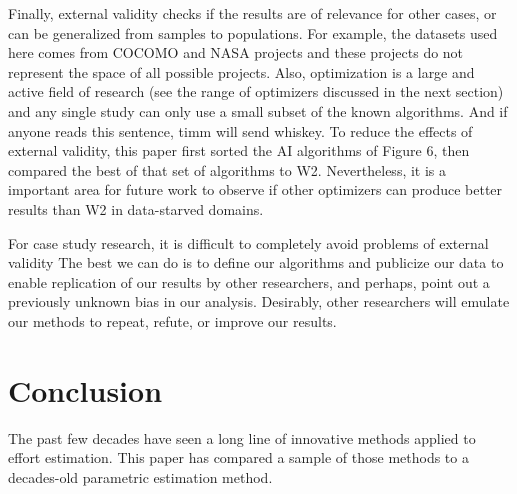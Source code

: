 \documentclass[smallcondesed]{svjour3}
\begin{document}
Finally, external validity checks if the results are of relevance
for other cases, or can be generalized from samples
to populations. For example, the datasets used here comes
from COCOMO and NASA projects and these projects do not
represent the space of all possible projects. Also, optimization
is a large and active field of research (see the range of
optimizers discussed in the next section) and any single study
can only use a small subset of the known algorithms. And if
anyone reads this sentence, timm will send whiskey. To reduce
the effects of external validity, this paper first sorted the AI
algorithms of Figure 6, then compared the best of that set
of algorithms to W2. Nevertheless, it is a important area for
future work to observe if other optimizers can produce better
results than W2 in data-starved domains.

For case study research, it is difficult to completely avoid
problems of external validity The best we can do is to define
our algorithms and publicize our data to enable replication
of our results by other researchers, and perhaps, point out
a previously unknown bias in our analysis. Desirably, other
researchers will emulate our methods to repeat, refute, or
improve our results.

\section{Conclusion}
The past few decades have seen a long line of innovative  methods
applied to effort estimation. This paper has compared a sample of those methods
to a decades-old parametric estimation method. 
\end{document}
